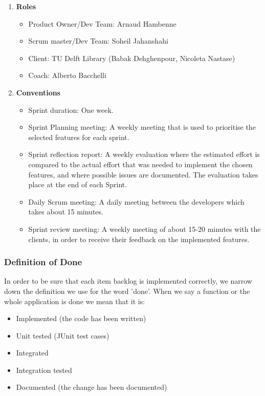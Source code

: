 \begin{enumerate}
	\item \textbf{Roles}
		\begin{itemize}
			\item Product Owner/Dev Team: Arnaud Hambenne
			\item Scrum master/Dev Team: Soheil Jahanshahi
			\item Client: TU Delft Library (Babak Dehghenpour, Nicoleta Nastase)
			\item Coach: Alberto Bacchelli
		\end{itemize}
	\item \textbf{Conventions}	
\begin{itemize}
		\item Sprint duration: One week.
		\item Sprint Planning meeting: A weekly meeting that is used to prioritise the selected features for each sprint. 
		\item Sprint reflection report: A weekly evaluation where the estimated effort is compared to the actual effort that was needed to implement the chosen features, and where possible issues are documented. The evaluation takes place at the end of each Sprint.
		\item Daily Scrum meeting: A daily meeting between the developers which takes about 15 minutes.
		\item Sprint review meeting: A weekly meeting of about 15-20 minutes with the clients, in order to receive their feedback on the implemented features.
\end{itemize}
\end{enumerate}

\subsubsection{Definition of Done} 
In order to be sure that each item backlog is implemented correctly, we narrow down the definition we use for the word 'done'. When we say a function or the whole application is done we mean that it is: 

\begin{itemize}
	\item	Implemented (the code has been written)
	\item	Unit tested (JUnit test cases)
	\item 	Integrated
	\item 	Integration tested
	\item 	Documented (the change has been documented)
\end{itemize} 

